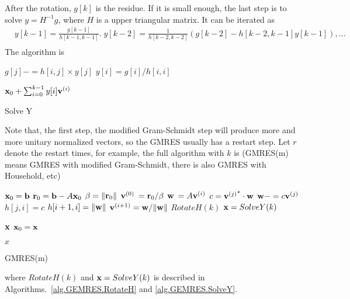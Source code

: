 After the rotation, $g[k]$ is the residue. If it is small enough, the last step is to solve $y=H^{-1}g$, where $H$ is a upper triangular matrix. It can be iterated as
\begin{equation}
\begin{split}
&y[k-1]=\frac{g[k-1]}{h[k-1,k-1]}.\;y[k-2]=\frac{1}{h[k-2,k-2]}\left(g[k-2]-h[k-2,k-1]y[k-1]\right),\ldots\\
\end{split}
\end{equation}
The algorithm is
\begin{algorithm}[H]
\begin{algorithmic}
        \State $g[j]-=h[i,j]\times y[j]$
    \EndFor
    \State $y[i] = g[i] / h[i,i]$
\EndFor

\Return ${\bf x}_0+\sum _{i=0}^{k-1}y[i]{\bf v}^{(i)}$
\end{algorithmic}
\caption{\label{alg.GEMRES.SolveY}Solve Y}
\end{algorithm}

Note that, the first step, the modified Gram-Schmidt step will produce more and more unitary normalized vectors, so the GMRES usually has a restart step. Let $r$ denote the restart times, for example, the full algorithm with $k$ is (GMRES(m) means GMRES with modified Gram-Schmidt, there is also GMRES with Household, etc)
\begin{algorithm}[H]
\begin{algorithmic}
\State ${\bf x}_0={\bf b}$
    \State ${\bf r}_0={\bf b}-A{\bf x}_0$
    \State $\beta = \|{\bf r}_0\|$
    \State ${\bf v}^{(0)}\:={\bf r}_0/\beta$
        \State ${\bf w}\:=A{\bf v}^{(i)}$
            \State $c={{\bf v}^{(j)}}^*\cdot {\bf w}$
            \State ${\bf w}-=c{\bf v}^{(j)}$
            \State $h[j,i]=c$
        \EndFor
        \State $h[i+1,i]=\|{\bf w}\|$
        \State ${\bf v}^{(i+1)}={\bf w}/\|{\bf w}\|$
    \EndFor
    \State $RotateH(k)$
    \State ${\bf x}=SolveY(k)$

        \Return ${\bf x}$
    \EndIf
    \State ${\bf x}_0={\bf x}$
\EndFor

\Return $x$
\end{algorithmic}
\caption{GMRES(m)}
\end{algorithm}
where $RotateH(k)$ and ${\bf x}=SolveY(k)$ is described in Algorithms.~\ref{alg.GEMRES.RotateH} and \ref{alg.GEMRES.SolveY}.


